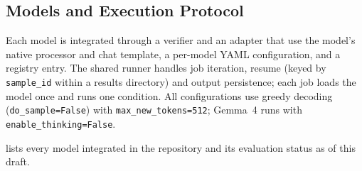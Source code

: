 \subsection{Models and Execution Protocol}
\label{sec:method:models}
Each model is integrated through a verifier and an adapter that use the model's
native processor and chat template, a per-model YAML configuration, and a
registry entry. The shared runner handles job iteration, resume (keyed by
\texttt{sample\_id} within a results directory) and output persistence; each
job loads the model once and runs one condition. All configurations use greedy
decoding (\texttt{do\_sample=False}) with \texttt{max\_new\_tokens=512};
Gemma~4 runs with \texttt{enable\_thinking=False}.

 lists every model integrated in the repository and its
evaluation status as of this draft.

